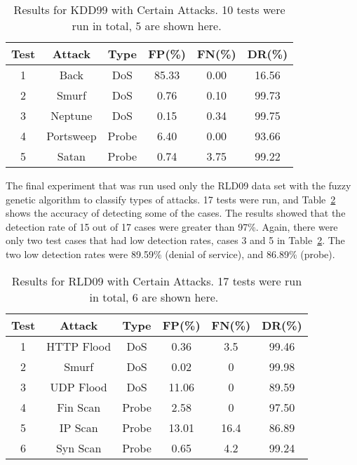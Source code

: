 \documentclass{sig-alternate}
\begin{document}
\begin{table}
\caption{Results for KDD99 with Certain Attacks. 10 tests were run in total, 5 are shown here.~\cite{6559603}}
\vspace{0.20cm}
\begin{tabular}{cccccc}
Test & Attack & Type & FP(\%) & FN(\%) & DR(\%)\\ \hline
1 & Back & DoS & 85.33 & 0.00 & 16.56\\
2 & Smurf & DoS & 0.76 & 0.10 & 99.73\\
3 & Neptune & DoS & 0.15 & 0.34 & 99.75\\
4 & Portsweep & Probe & 6.40 & 0.00 & 93.66\\
5 & Satan & Probe & 0.74 & 3.75 & 99.22\\
\end{tabular}
\label{tab:kddAttacks}
\end{table}

The final experiment that was run used only the RLD09 data set with the fuzzy genetic algorithm to classify types of attacks. 17 tests were run, and Table~\ref{tab:rldAttacks} shows the accuracy of detecting some of the cases. The results showed that the detection rate of 15 out of 17 cases were greater than 97\%. Again, there were only two test cases that had low detection rates, cases 3 and 5 in Table~\ref{tab:rldAttacks}. The two low detection rates were 89.59\% (denial of service), and 86.89\% (probe).

\begin{table}
\caption{Results for RLD09 with Certain Attacks. 17 tests were run in total, 6 are shown here.~\cite{6559603}}
\vspace{0.20cm}
\begin{tabular}{cccccc}
Test & Attack & Type & FP(\%) & FN(\%) & DR(\%)\\ \hline
1 & HTTP Flood & DoS & 0.36 & 3.5 & 99.46\\
2 & Smurf & DoS & 0.02 & 0 & 99.98\\
3 & UDP Flood & DoS & 11.06 & 0 & 89.59\\
4 & Fin Scan & Probe & 2.58 & 0 & 97.50\\
5 & IP Scan & Probe & 13.01 & 16.4 & 86.89\\
6 & Syn Scan & Probe & 0.65 & 4.2 & 99.24\\
\end{tabular}
\label{tab:rldAttacks}
\end{table}
\end{document}
